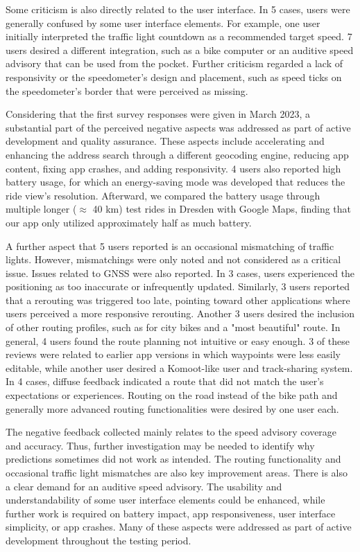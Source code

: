 Some criticism is also directly related to the user interface. In 5 cases, users were generally confused by some user interface elements. For example, one user initially interpreted the traffic light countdown as a recommended target speed. 7 users desired a different integration, such as a bike computer or an auditive speed advisory that can be used from the pocket. Further criticism regarded a lack of responsivity or the speedometer's design and placement, such as speed ticks on the speedometer's border that were perceived as missing.

Considering that the first survey responses were given in March 2023, a substantial part of the perceived negative aspects was addressed as part of active development and quality assurance. These aspects include accelerating and enhancing the address search through a different geocoding engine, reducing app content, fixing app crashes, and adding responsivity. 4 users also reported high battery usage, for which an energy-saving mode was developed that reduces the ride view's resolution. Afterward, we compared the battery usage through multiple longer ($\approx$ 40 km) test rides in Dresden with Google Maps, finding that our app only utilized approximately half as much battery.

A further aspect that 5 users reported is an occasional mismatching of traffic lights. However, mismatchings were only noted and not considered as a critical issue. Issues related to GNSS were also reported. In 3 cases, users experienced the positioning as too inaccurate or infrequently updated. Similarly, 3 users reported that a rerouting was triggered too late, pointing toward other applications where users perceived a more responsive rerouting. Another 3 users desired the inclusion of other routing profiles, such as for city bikes and a "most beautiful" route. In general, 4 users found the route planning not intuitive or easy enough. 3 of these reviews were related to earlier app versions in which waypoints were less easily editable, while another user desired a Komoot-like user and track-sharing system. In 4 cases, diffuse feedback indicated a route that did not match the user's expectations or experiences. Routing on the road instead of the bike path and generally more advanced routing functionalities were desired by one user each.

The negative feedback collected mainly relates to the speed advisory coverage and accuracy. Thus, further investigation may be needed to identify why predictions sometimes did not work as intended. The routing functionality and occasional traffic light mismatches are also key improvement areas. There is also a clear demand for an auditive speed advisory. The usability and understandability of some user interface elements could be enhanced, while further work is required on battery impact, app responsiveness, user interface simplicity, or app crashes. Many of these aspects were addressed as part of active development throughout the testing period.

